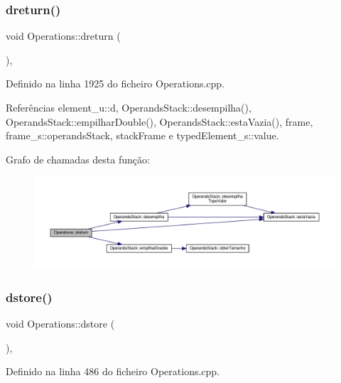 \subsubsection{\texorpdfstring{dreturn()}{dreturn()}}
{\footnotesize\ttfamily void Operations\+::dreturn (\begin{DoxyParamCaption}{ }\end{DoxyParamCaption})\hspace{0.3cm}{\ttfamily [static]}, {\ttfamily [private]}}



Definido na linha 1925 do ficheiro Operations.\+cpp.



Referências element\+\_\+u\+::d, Operands\+Stack\+::desempilha(), Operands\+Stack\+::empilhar\+Double(), Operands\+Stack\+::esta\+Vazia(), frame, frame\+\_\+s\+::operands\+Stack, stack\+Frame e typed\+Element\+\_\+s\+::value.

Grafo de chamadas desta função\+:\nopagebreak
\begin{figure}[H]
\begin{center}
\leavevmode
\includegraphics[width=350pt]{classOperations_a85ce8267820ffcc1e1530d533545c9f3_cgraph}
\end{center}
\end{figure}
\mbox{\label{classOperations_a83fb57afed30b1223f8485492f9d9958}} 
\subsubsection{\texorpdfstring{dstore()}{dstore()}}
{\footnotesize\ttfamily void Operations\+::dstore (\begin{DoxyParamCaption}{ }\end{DoxyParamCaption})\hspace{0.3cm}{\ttfamily [static]}, {\ttfamily [private]}}



Definido na linha 486 do ficheiro Operations.\+cpp.



